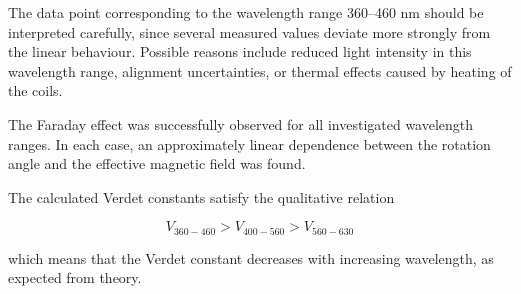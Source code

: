The data point corresponding to the wavelength range 360--460 nm should be interpreted carefully, since several measured values 
deviate more strongly from the linear behaviour. Possible reasons include reduced light intensity in this wavelength range, 
alignment uncertainties, or thermal effects caused by heating of the coils.


The Faraday effect was successfully observed for all investigated wavelength ranges. In each case, an approximately linear 
dependence between the rotation angle and the effective magnetic field was found.

The calculated Verdet constants satisfy the qualitative relation

\[
V_{360-460}
>
V_{400-560}
>
V_{560-630}
\]

which means that the Verdet constant decreases with increasing wavelength, as expected from theory.

